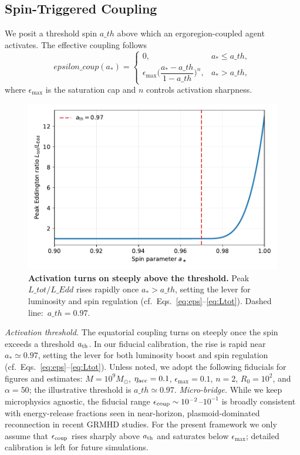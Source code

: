 \documentclass[twocolumn]{aastex701}
\newcommand{\ath}{a_{\rm th}}
\newcommand{\rg}{r_g}
\newcommand{\LEdd}{L_{\rm Edd}}
\newcommand{\Ltot}{L_{\rm tot}}
\newcommand{\FeKa}{\mathrm{Fe\,K}\alpha}
\newcommand{\epscoup}{\epsilon_{\rm coup}}
\newcommand{\aeq}{a_{\rm eq}}
\def\ath{a\_th}\def\rg{r\_g}\def\LEdd{L\_Edd}\def\Ltot{L\_tot}\def\FeKa{Fe K\string\alpha}%
\def\epscoup{epsilon\_coup}\def\aeq{a\_eq}\def\mathrm#1{#1}%
\begin{document}
\subsection{Spin-Triggered Coupling}\label{sec:coupling}
We posit a threshold spin $\ath$ above which an ergoregion-coupled agent activates. The effective coupling follows
\begin{equation}
\epscoup(a_\ast)=
\begin{cases}
0, & a_\ast\le \ath,\\[3pt]
\epsilon_{\max}\Big(\dfrac{a_\ast-\ath}{1-\ath}\Big)^{n}, & a_\ast>\ath,
\end{cases}
\label{eq:eps}
\end{equation}
where $\epsilon_{\max}$ is the saturation cap and $n$ controls activation sharpness.
\begin{figure}[!htbp]
  \centering
  \includegraphics[width=.92\linewidth]{Fig_Onset.pdf}
\caption{\textbf{Activation turns on steeply above the threshold.}
Peak $\Ltot/\LEdd$ rises rapidly once $a_\ast\!>\!\ath$, setting the lever for luminosity and spin regulation (cf.\ Eqs.~\eqref{eq:eps}--\eqref{eq:Ltot}). Dashed line: $\,\ath=0.97$.}
  \label{fig:onset}
\end{figure}
\noindent\textit{Activation threshold.}
The equatorial coupling turns on steeply once the spin exceeds a threshold \(a_{\rm th}\).
In our fiducial calibration, the rise is rapid near \(a_\ast \simeq 0.97\), setting the lever for both luminosity boost and spin regulation (cf.\ Eqs.~\eqref{eq:eps}--\eqref{eq:Ltot}).
\FloatBarrier
Unless noted, we adopt the following fiducials for figures and estimates: $M=10^9M_\odot$, $\eta_{\rm acc}=0.1$, $\epsilon_{\max}=0.1$, $n=2$, $R_0=10^2$, and $\alpha=50$; the illustrative threshold is $\ath\simeq0.97$.
\noindent\emph{Micro-bridge.}
While we keep microphysics agnostic, the fiducial range
$\epsilon_{\rm coup}\sim10^{-2}$–$10^{-1}$ is broadly consistent with
energy-release fractions seen in near-horizon, plasmoid-dominated
reconnection in recent GRMHD studies. For the present framework we only
assume that $\epsilon_{\rm coup}$ rises sharply above $a_{\rm th}$ and
saturates below $\epsilon_{\max}$; detailed calibration is left for
future simulations.
\end{document}
